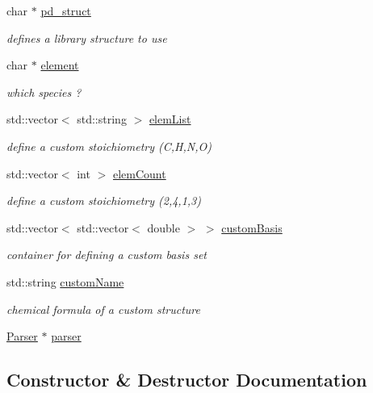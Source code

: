 \begin{DoxyCompactItemize}
char $\ast$ \hyperlink{class_reader_aa1f260272da17a496f1ecd3ce39281b9}{pd\+\_\+struct}
\begin{DoxyCompactList}\small\item\em defines a library structure to use \end{DoxyCompactList}\item 
char $\ast$ \hyperlink{class_reader_aad797cfb4296c19561d2729de8cd9333}{element}
\begin{DoxyCompactList}\small\item\em which species ? \end{DoxyCompactList}\item 
std\+::vector$<$ std\+::string $>$ \hyperlink{class_reader_a81df051804ba55004944e2d6f9a43cf7}{elem\+List}
\begin{DoxyCompactList}\small\item\em define a custom stoichiometry (C,H,N,O) \end{DoxyCompactList}\item 
std\+::vector$<$ int $>$ \hyperlink{class_reader_a81393d6441793db4fd62c7a4652518d3}{elem\+Count}
\begin{DoxyCompactList}\small\item\em define a custom stoichiometry (2,4,1,3) \end{DoxyCompactList}\item 
std\+::vector$<$ std\+::vector$<$ double $>$ $>$ \hyperlink{class_reader_a5f34996abadc7f998ffd1c34c4cfb380}{custom\+Basis}
\begin{DoxyCompactList}\small\item\em container for defining a custom basis set \end{DoxyCompactList}\item 
std\+::string \hyperlink{class_reader_a5cad9d6f8773e4ca9e6ae63b4dd7a307}{custom\+Name}
\begin{DoxyCompactList}\small\item\em chemical formula of a custom structure \end{DoxyCompactList}\item 
\hyperlink{class_parser}{Parser} $\ast$ \hyperlink{class_reader_a4a2ce1dccacd1cb00f0a226f4f78c9d6}{parser}
\end{DoxyCompactItemize}


\subsection{Constructor \& Destructor Documentation}
\hypertarget{class_reader_adcda31b507720ab44044d7a21686fba2}{}
